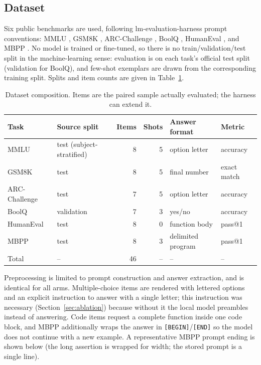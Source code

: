 \documentclass[11pt,a4paper]{article}
\begin{document}
\subsection{Dataset}
\label{sec:dataset}
Six public benchmarks are used, following lm-evaluation-harness prompt
conventions: MMLU \cite{mmlu}, GSM8K \cite{gsm8k}, ARC-Challenge \cite{arc},
BoolQ \cite{boolq}, HumanEval \cite{humaneval}, and MBPP \cite{mbpp}. No model
is trained or fine-tuned, so there is no train/validation/test split in the
machine-learning sense: evaluation is on each task's official test split
(validation for BoolQ), and few-shot exemplars are drawn from the corresponding
training split. Splits and item counts are given in Table~\ref{tab:dataset}.

\begin{table}[!htbp]
\centering
\small
\caption{Dataset composition. Items are the paired sample actually evaluated;
the harness can extend it.}
\label{tab:dataset}
\begin{tabular}{@{}llrrll@{}}
\toprule
Task & Source split & Items & Shots & Answer format & Metric \\
\midrule
MMLU & test (subject-stratified) & 8 & 5 & option letter & accuracy \\
GSM8K & test & 8 & 5 & final number & exact match \\
ARC-Challenge & test & 7 & 5 & option letter & accuracy \\
BoolQ & validation & 7 & 3 & yes/no & accuracy \\
HumanEval & test & 8 & 0 & function body & pass@1 \\
MBPP & test & 8 & 3 & delimited program & pass@1 \\
\midrule
Total & -- & 46 & -- & -- & -- \\
\bottomrule
\end{tabular}
\end{table}

Preprocessing is limited to prompt construction and answer extraction, and is
identical for all arms. Multiple-choice items are rendered with lettered options
and an explicit instruction to answer with a single letter; this instruction was
necessary (Section~\ref{sec:ablation}) because without it the local model
preambles instead of answering. Code items request a complete function inside
one code block, and MBPP additionally wraps the answer in
\texttt{[BEGIN]}/\texttt{[END]} so the model does not continue with a new
example. A representative MBPP prompt ending is shown below (the long
assertion is wrapped for width; the stored prompt is a single line).
\end{document}
